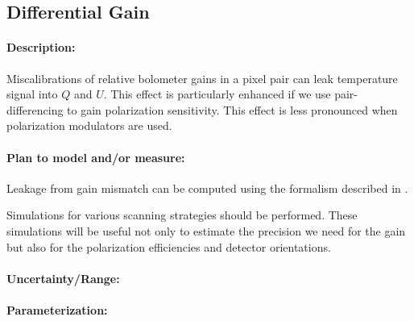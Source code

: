 \subsection{Differential Gain}

\paragraph{Description:}
Miscalibrations of relative bolometer gains in a pixel pair can leak temperature signal into $Q$ and $U$. This effect is particularly enhanced if we use pair-differencing to gain polarization sensitivity. This effect is less pronounced when polarization modulators are used.

\paragraph{Plan to model and/or measure:}
Leakage from gain mismatch can be computed using the formalism described in \cite{rosset2010}.

Simulations for various scanning strategies should be performed. These simulations will be useful not only to estimate the precision we need for the gain but also for the polarization efficiencies and detector orientations.

\paragraph{Uncertainty/Range:}

\paragraph{Parameterization:}
